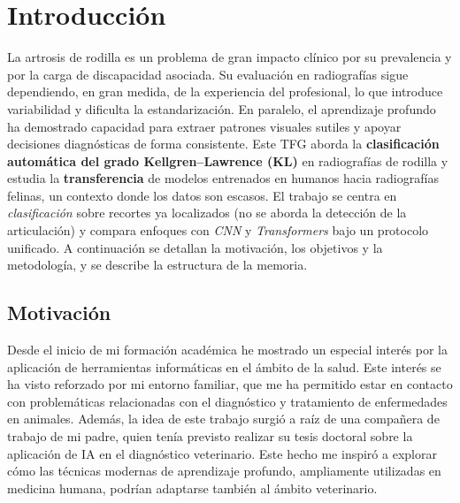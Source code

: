 \documentclass[11pt,spanish,listoffigures,listoftables]{tfgetsinf}
\begin{document}
\begin{abstract}[catalan]
Aquest treball \textbf{demostra la viabilitat} de les \textit{CNN} i \textit{Transformers} com a eines de suport al diagnòstic de l'artrosi de genoll, \textbf{valida el \textit{transfer learning}} en contextos clínics i \textbf{obre la porta} a la seua aplicació en l'àmbit veterinari. Persistixen reptes com el \textbf{desbalanceig de classes}, l'\textbf{ambigüitat en graus lleus}, la \textbf{mida reduïda de mostres} i la \textbf{calibració} dels models.

    
\end{abstract}
    
\mainmatter

\chapter{Introducción}
La artrosis de rodilla es un problema de gran impacto clínico por su prevalencia y por la carga de discapacidad asociada. Su evaluación en radiografías sigue dependiendo, en gran medida, de la experiencia del profesional, lo que introduce variabilidad y dificulta la estandarización. En paralelo, el aprendizaje profundo ha demostrado capacidad para extraer patrones visuales sutiles y apoyar decisiones diagnósticas de forma consistente. Este TFG aborda la \textbf{clasificación automática del grado Kellgren–Lawrence (KL)} en radiografías de rodilla y estudia la \textbf{transferencia} de modelos entrenados en humanos hacia radiografías felinas, un contexto donde los datos son escasos. El trabajo se centra en \textit{clasificación} sobre recortes ya localizados (no se aborda la detección de la articulación) y compara enfoques con \emph{CNN} y \emph{Transformers} bajo un protocolo unificado. A continuación se detallan la motivación, los objetivos y la metodología, y se describe la estructura de la memoria.


\section{Motivación}     %

Desde el inicio de mi formación académica he mostrado un especial interés por la aplicación de herramientas informáticas en el ámbito de la salud. Este interés se ha visto reforzado por mi entorno familiar, que me ha permitido estar en contacto con problemáticas relacionadas con el diagnóstico y tratamiento de enfermedades en animales. Además, la idea de este trabajo surgió a raíz de una compañera de trabajo de mi padre, quien tenía previsto realizar su tesis doctoral sobre la aplicación de IA en el diagnóstico veterinario. Este hecho me inspiró a explorar cómo las técnicas modernas de aprendizaje profundo, ampliamente utilizadas en medicina humana, podrían adaptarse también al ámbito veterinario.
\end{document}
